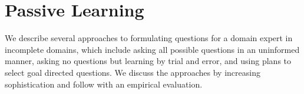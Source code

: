 \documentclass[letterpaper]{article}
\def\und#1{\noindent{\bf #1}:}
\begin{document}
% 
% 
% 


\section{Passive Learning}

We describe several approaches to formulating questions for a domain expert in
incomplete domains, which include asking all possible questions in an uninformed
manner, asking no questions but learning by trial and error, and using plans to
select goal directed questions. We discuss the approaches by increasing
sophistication and follow with an empirical evaluation.
% 
\end{document}
